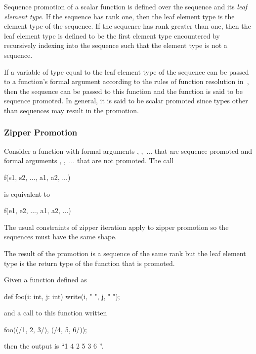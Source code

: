 Sequence promotion of a scalar function is defined over the sequence
and its {\em leaf element type}.  If the sequence has rank one, then
the leaf element type is the element type of the sequence.  If the
sequence has rank greater than one, then the leaf element type is
defined to be the first element type encountered by recursively
indexing into the sequence such that the element type is not a
sequence.

If a variable of type equal to the leaf element type of the sequence
can be passed to a function's formal argument according to the rules
of function resolution in~, then the
sequence can be passed to this function and the function is said to be
sequence promoted.  In general, it is said to be scalar promoted since
types other than sequences may result in the promotion.

\subsubsection{Zipper Promotion}
\label{Zipper_Promotion}

Consider a function  with formal
arguments , ,~... that are sequence promoted and
formal arguments , ,~... that are not promoted.  The
call
\begin{chapel}
f(s1, s2, ..., a1, a2, ...)
\end{chapel}
is equivalent to
\begin{chapel}
[(e1, e2, ...) in (s1, s2, ...)] f(e1, e2, ..., a1, a2, ...)
\end{chapel}
The usual constraints of zipper iteration apply to zipper promotion so
the sequences must have the same shape.

The result of the promotion is a sequence of the same rank but the
leaf element type is the return type of the function that is promoted.

\begin{example}
Given a function defined as
\begin{chapel}
def foo(i: int, j: int) {
  write(i, " ", j, " ");
}
\end{chapel}
and a call to this function written
\begin{chapel}
foo((/1, 2, 3/), (/4, 5, 6/));
\end{chapel}
then the output is ``1 4 2 5 3 6 ''.
\end{example}

